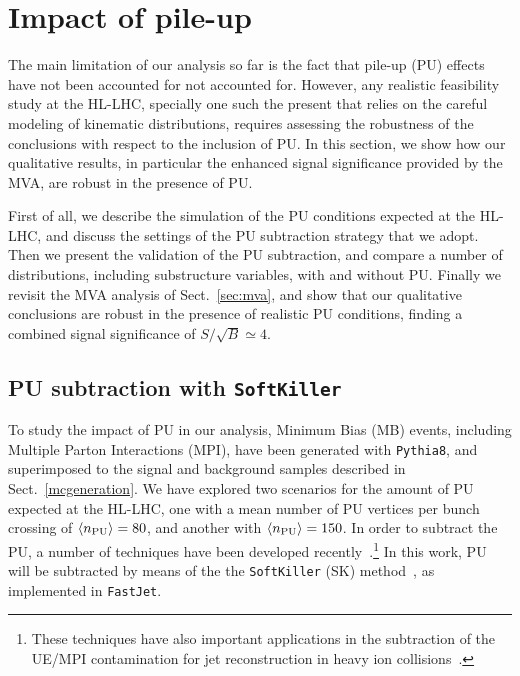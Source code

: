 \clearpage
\section{Impact of pile-up}

\label{sec:pileup}

The main limitation of our analysis so far is the fact that
pile-up (PU) effects have not been accounted for
not accounted for.
%
However, any realistic feasibility study at the HL-LHC, specially
one 
such the present that relies on the careful modeling
of kinematic distributions,
requires assessing the robustness of the conclusions
with respect to the inclusion of PU.
%
In this section, we show how our qualitative results, in particular
the enhanced signal significance provided by the MVA, are robust
in the presence of  PU.


First of all, we describe the simulation of the 
PU conditions  expected at the HL-LHC, and discuss the settings of
the PU subtraction strategy that we adopt.
%
Then we present the validation of the PU subtraction,
and compare a number of distributions, including substructure variables,
with and without PU.
%
Finally we revisit the MVA analysis of Sect.~\ref{sec:mva}, and
show that our qualitative conclusions are robust
in the presence of realistic PU conditions, finding
a combined
signal significance of $S/\sqrt{B}\simeq 4$.


\subsection{PU subtraction with {\tt SoftKiller}}

To study the impact of PU in our analysis,
Minimum Bias (MB) events,
including Multiple Parton Interactions (MPI), have been generated
with {\tt Pythia8}, and
superimposed to the signal
and background samples described in Sect.~\ref{mcgeneration}.
%
We have explored two scenarios for the amount of PU expected
at the HL-LHC, one with a mean number of
PU vertices per bunch crossing of $\left\langle n_{\rm PU}\right\rangle=80$, and another
with $\left\langle n_{\rm PU}\right\rangle=150$.
%
In order to subtract the PU, a number of techniques
have been developed
recently~\cite{Cacciari:2009dp,TheATLAScollaboration:2013pia,Butterworth:2008iy,Cacciari:2007fd,Krohn:2009th,Krohn:2013lba,Ellis:2009me,Bertolini:2014bba,Cacciari:2014gra,Cacciari:2014jta,Berta:2014eza,Larkoski:2014wba}.\footnote{
These techniques have also important applications in the subtraction
of the UE/MPI contamination for jet reconstruction
in heavy ion collisions~\cite{Cacciari:2010te}.
}
%
In this work, PU  will be subtracted by means
of the the {\tt SoftKiller} (SK)
method~\cite{Cacciari:2014gra}, as implemented in {\tt FastJet}.
%

